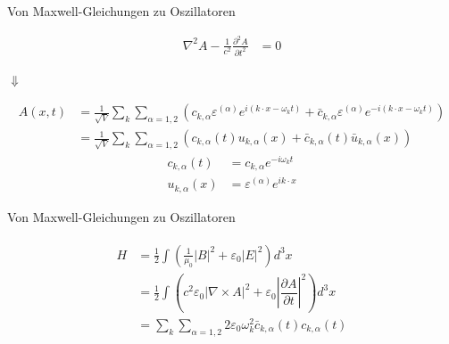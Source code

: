 \documentclass{beamer}
\begin{document}
\begin{frame}[t]{Von Maxwell-Gleichungen zu Oszillatoren}
	\vspace*{-0.5cm}
	\begin{center}
		\begin{minipage}{0.35\textwidth}
			\begin{align*}
			\nabla^2 A - \frac{1}{c^2} \frac{\partial^2 A }{\partial t^2} &= 0
			\end{align*}
		\end{minipage}
		
		\vspace*{0.5cm}
		$\Downarrow$
		
		\begin{minipage}{0.35\textwidth}
			\begin{align*}
			A(x,t) &= \frac{1}{\sqrt{V}} \sum_k \sum_{\alpha=1,2} \left(c_{k,\alpha} \varepsilon^{(\alpha)} e^{i (k \cdot x - \omega_k t)} + \bar{c}_{k,\alpha} \varepsilon^{(\alpha)} e^{-i(k \cdot x - \omega_k t)}\right)\\
			&= \frac{1}{\sqrt{V}} \sum_k \sum_{\alpha=1,2} \left(c_{k,\alpha}(t)u_{k,\alpha}(x) + \bar{c}_{k,\alpha}(t) \bar{u}_{k,\alpha}(x) \right)
			\end{align*}
			\begin{align*}
				c_{k,\alpha}(t) &= c_{k,\alpha} e^{-i \omega_k t} \\
				u_{k,\alpha}(x) &= \varepsilon^{(\alpha)} e^{ik \cdot x}
			\end{align*}
			
		\end{minipage}
	\end{center}
\end{frame}

\begin{frame}[t]{Von Maxwell-Gleichungen zu Oszillatoren}
	\vspace*{-0.5cm}
	\begin{center}
		\begin{minipage}{0.35\textwidth}
			\begin{align*}
			\begin{split}
			H &= \frac{1}{2} \int \left(\frac{1}{\mu_0}|B|^2 + \varepsilon_0|E|^2\right) d^3 x \\
			&= \frac{1}{2} \int \left(c^2 \varepsilon_0 | \nabla\times A |^2 + \varepsilon_0 \left| \dfrac{\partial A}{\partial t} \right|^2 \right) d^3 x \\
			& = \sum_k \sum_{\alpha=1,2} 2 \varepsilon_0 \omega_k^2 \bar{c}_{k,\alpha}(t) c_{k,\alpha}(t)
			\end{split}
			\end{align*}
		\end{minipage}
	\end{center}
\end{frame}
\end{document}
